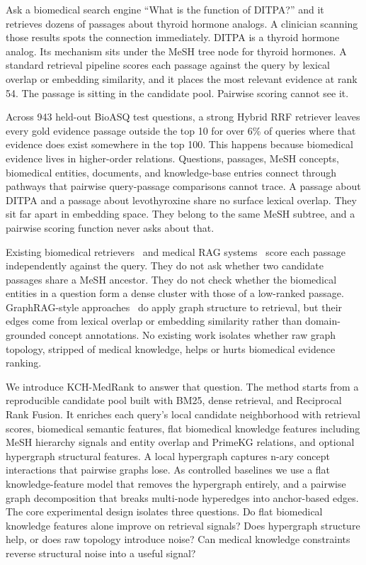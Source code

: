 Ask a biomedical search engine ``What is the function of DITPA?'' and it retrieves dozens of passages about thyroid hormone analogs. A clinician scanning those results spots the connection immediately. DITPA is a thyroid hormone analog. Its mechanism sits under the MeSH tree node for thyroid hormones. A standard retrieval pipeline scores each passage against the query by lexical overlap or embedding similarity, and it places the most relevant evidence at rank 54. The passage is sitting in the candidate pool. Pairwise scoring cannot see it.

Across 943 held-out BioASQ test questions, a strong Hybrid RRF retriever leaves every gold evidence passage outside the top 10 for over 6\% of queries where that evidence does exist somewhere in the top 100. This happens because biomedical evidence lives in higher-order relations. Questions, passages, MeSH concepts, biomedical entities, documents, and knowledge-base entries connect through pathways that pairwise query-passage comparisons cannot trace. A passage about DITPA and a passage about levothyroxine share no surface lexical overlap. They sit far apart in embedding space. They belong to the same MeSH subtree, and a pairwise scoring function never asks about that.

Existing biomedical retrievers~\citep{jin2023medcpt} and medical RAG systems~\citep{xiong2024benchmarking,xiong2024imedrag} score each passage independently against the query. They do not ask whether two candidate passages share a MeSH ancestor. They do not check whether the biomedical entities in a question form a dense cluster with those of a low-ranked passage. GraphRAG-style approaches~\citep{edge2024graphrag,wu2024medgraphrag,luo2025hypergraphrag} do apply graph structure to retrieval, but their edges come from lexical overlap or embedding similarity rather than domain-grounded concept annotations. No existing work isolates whether raw graph topology, stripped of medical knowledge, helps or hurts biomedical evidence ranking.

We introduce KCH-MedRank to answer that question. The method starts from a reproducible candidate pool built with BM25, dense retrieval, and Reciprocal Rank Fusion. It enriches each query's local candidate neighborhood with retrieval scores, biomedical semantic features, flat biomedical knowledge features including MeSH hierarchy signals and entity overlap and PrimeKG relations, and optional hypergraph structural features. A local hypergraph captures n-ary concept interactions that pairwise graphs lose. As controlled baselines we use a flat knowledge-feature model that removes the hypergraph entirely, and a pairwise graph decomposition that breaks multi-node hyperedges into anchor-based edges. The core experimental design isolates three questions. Do flat biomedical knowledge features alone improve on retrieval signals? Does hypergraph structure help, or does raw topology introduce noise? Can medical knowledge constraints reverse structural noise into a useful signal?

